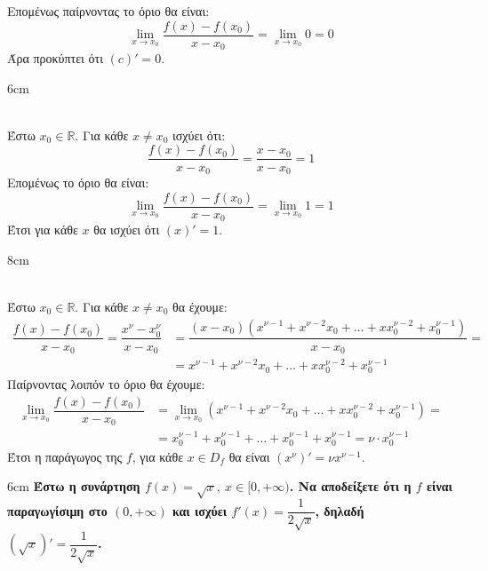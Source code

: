 Επομένως παίρνοντας το όριο θα είναι:
\[ \lim_{x\to x_0}{\dfrac{f(x)-f(x_0)}{x-x_0}}=\lim_{x\to x_0}{0}=0 \]
Άρα προκύπτει ότι $ (c)'=0 $.
\begin{Thewrhmabox}{6cm}
\label{thewrhma:paragwgos_taytotikhs}
\end{Thewrhmabox}
\textbf{}\\
Έστω $x_0\in\mathbb{R}$. Για κάθε $ x\neq x_0 $ ισχύει ότι:
\[ \frac{f(x)-f(x_0)}{x-x_0}=\frac{x-x_0}{x-x_0}=1 \]
Επομένως το όριο θα είναι:
\[ \lim_{x\to x_0}{\frac{f(x)-f(x_0)}{x-x_0}}=\lim_{x\to x_0}{1}=1 \]
Έτσι για κάθε $ x $ θα ισχύει ότι $ (x)'=1 $.
\begin{Thewrhmabox}{8cm}
\label{thewrhma:paragwgos_dynamhs}
\end{Thewrhmabox}
\textbf{}\\
Έστω $ x_0\in\mathbb{R} $. Για κάθε $ x\neq x_0 $ θα έχουμε:
\begin{align*}
\dfrac{f(x)-f(x_0)}{x-x_0}=\dfrac{x^\nu-x_0^\nu}{x-x_0}&=\dfrac{(x-x_0)\left(x^{\nu-1}+x^{\nu-2}x_0+\ldots+xx_0^{\nu-2}+x_0^{\nu-1} \right) }{x-x_0}=\\
&=x^{\nu-1}+x^{\nu-2}x_0+\ldots+xx_0^{\nu-2}+x_0^{\nu-1}
\end{align*}
Παίρνοντας λοιπόν το όριο θα έχουμε:
\begin{align*}
\lim_{x\to x_0}{\dfrac{f(x)-f(x_0)}{x-x_0}}&=\lim_{x\to x_0}{\left( x^{\nu-1}+x^{\nu-2}x_0+\ldots+xx_0^{\nu-2}+x_0^{\nu-1}\right) }=\\
&=x_0^{\nu-1}+x_0^{\nu-1}+\ldots+x_0^{\nu-1}+x_0^{\nu-1}=\nu\cdot x_0^{\nu-1}
\end{align*}
Έτσι η παράγωγος της $ f $, για κάθε $ x\in D_f $ θα είναι $ \left( x^\nu\right)'=\nu x^{\nu-1} $.
\begin{Thewrhmabox}{6cm}
\label{thewrhma:paragwgos_arrhths}
\textbf{Έστω η συνάρτηση $f(x)=\sqrt{x},\ x\in[0,+\infty)$. Να αποδείξετε ότι η $f$ είναι παραγωγίσιμη στο $(0,+\infty)$ και ισχύει $f'(x)=\dfrac{1}{2\sqrt{x}}$, δηλαδή $ \left(\sqrt{x}\right)'=\dfrac{1}{2\sqrt{x}}$.}
\end{Thewrhmabox}
